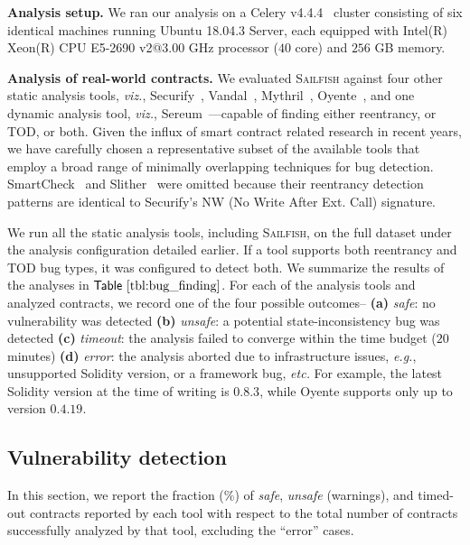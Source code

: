 \documentclass[conference, romanappendices]{tex/IEEEtran}
\theoremstyle{bfnote}
\newcommand{\toolname}{\textsc{Sailfish}\xspace}
\newcommand{\oyente}{{\sc Oyente}\xspace}
\newcommand{\securify}{{\sc Securify}\xspace}
\newcommand{\sereum}{{\sc Sereum}\xspace}
\newcommand{\slither}{{\sc Slither}\xspace}
\newcommand{\smartcheck}{{\sc SmartCheck}\xspace}
\newcommand{\vandal}{{\sc Vandal}\xspace}
\newcommand{\solidity}{{\sc Solidity}\xspace}
\newcommand{\smart}{smart contract}
\newcommand{\reentrancy}{{reentrancy}\xspace}
\newcommand{\si}{{state-inconsistency}\xspace}
\newcommand{\mythril}{{\sc Mythril}\xspace}
\newcommand{\etc}{\textit{etc.}}
\newcommand{\eg}{\textit{e.g.}}
\newcommand{\viz}{\textit{viz.}}
\newcommand{\Tbl}[1]{\ensuremath{\sf Table~\ref{#1}}}
\newcommand{\timeBudget}{20}
\begin{document}
\noindent
\textbf{Analysis setup.}
We ran our analysis on a Celery v4.4.4~\cite{celery} cluster consisting of six identical machines running Ubuntu 18.04.3 Server, each equipped with Intel(R) Xeon(R) CPU E5-2690 v2@3.00 GHz processor ($40$ core) and $256$ GB memory.

\noindent
\textbf{Analysis of real-world contracts.}
We evaluated \toolname{} against four other static analysis tools, \viz,  \securify~\cite{securify}, \vandal~\cite{vandal}, \mythril~\cite{mythril}, \oyente~\cite{oyente}, and one dynamic analysis tool, \viz, \sereum~\cite{sereum}---capable of finding either \reentrancy, or {TOD\EndAccSupp{}}, or both.
Given the influx of \smart{} related research in recent years, we have carefully chosen a representative subset of the available tools that employ a broad range of minimally overlapping techniques for bug detection.
\smartcheck~\cite{smartcheck} and \slither~\cite{slither} were omitted because their {reentrancy\EndAccSupp{}} detection patterns are identical to \securify's NW (No Write After Ext. Call) signature.

We run all the static analysis tools, including \toolname, on the full dataset under the analysis configuration detailed earlier.
If a tool supports both \reentrancy and {TOD\EndAccSupp{}} bug types, it was configured to detect both.
We summarize the results of the analyses in \Tbl{tbl:bug_finding}.
For each of the analysis tools and analyzed contracts, we record one of the four possible outcomes--
\textbf{(a)} \textit{safe}: no vulnerability was detected 
\textbf{(b)} \textit{unsafe}: a potential \si bug was detected
\textbf{(c)} \textit{timeout}: the analysis failed to converge within the time budget ($\timeBudget$ minutes)
\textbf{(d)} \textit{error}: the analysis aborted due to infrastructure issues, \eg, unsupported \solidity{} version, or a framework bug, \etc{}
For example, the latest \solidity{} version at the time of writing is $0.8.3$, while \oyente{} supports only up to version $0.4.19$.

\subsection{Vulnerability detection}
\label{sec:vulnerability_detection}
In this section, we report the fraction ($\%$) of \emph{safe}, \emph{unsafe} (warnings), and timed-out contracts reported by each tool with respect to the total number of contracts successfully analyzed by that tool, excluding the ``error'' cases.
\end{document}
